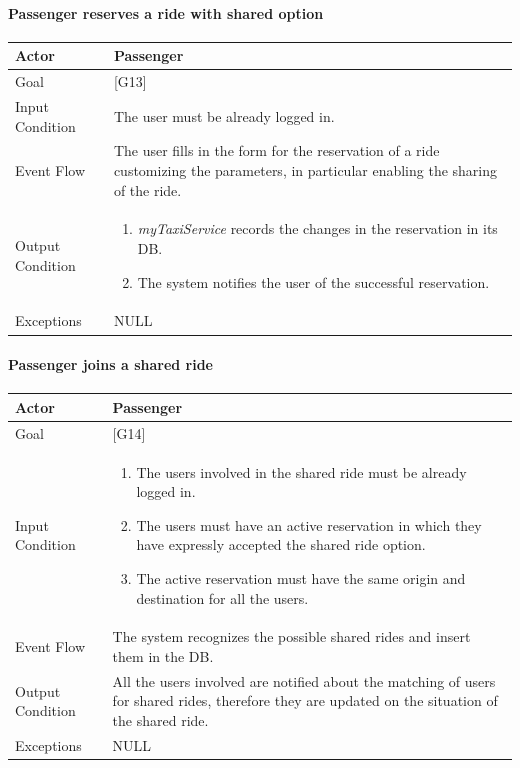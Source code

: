 \documentclass[a4paper,11pt]{report} %
\newcommand{\mts}{\mbox{\normalfont\itshape myTaxiService}}
\begin{document}
	\pagebreak
	
	\paragraph{Passenger reserves a ride with shared option}
	\begin{center}
		\begin{tabular}{| l | p{9cm} |}\hline
			Actor & Passenger\\\hline
			Goal & {[}G13{]} \\\hline
			Input Condition & The user must be already logged in.\\\hline
			Event Flow & The user fills in the form for the reservation of a ride customizing the parameters, in particular enabling the sharing of the ride.\\\hline
			Output Condition & \begin{enumerate}
				\item \mts{} records the changes in the reservation in its DB.
				\item The system notifies the user of the successful reservation.
			\end{enumerate}\\\hline
			Exceptions & NULL\\\hline
		\end{tabular}
	\end{center}	
	
	\pagebreak
	
	\paragraph{Passenger joins a shared ride}
	\begin{center}
		\begin{tabular}{| l | p{9cm} |}\hline
			Actor & Passenger\\\hline
			Goal & {[}G14{]} \\\hline
			Input Condition & \begin{enumerate}
				\item The users involved in the shared ride must be already logged in.
				\item The users must have an active reservation in which they have expressly accepted the shared ride option.
				\item The active reservation must have the same origin and destination for all the users.
			\end{enumerate}\\\hline
			Event Flow & The system recognizes the possible shared rides and insert them in the DB.\\\hline
			Output Condition & All the users involved are notified about the matching of users for shared rides, therefore they are updated on the situation of the shared ride.\\\hline
			Exceptions & NULL\\\hline
		\end{tabular}
	\end{center}	
	
\end{document}
